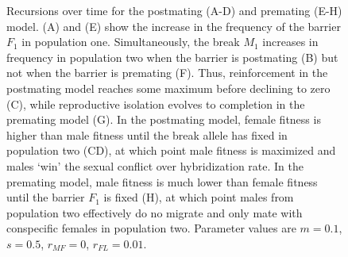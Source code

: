 \documentclass[11pt]{article}
\begin{document}

\begin{figure}
[!htb]
\centering
{}
\caption{
\linespread{1.618}\selectfont
Recursions over time for the postmating (A-D) and premating (E-H) model. (A) and (E) show the increase in the frequency of the barrier $F_1$ in population one.  Simultaneously, the break $M_1$ increases in frequency in population two when the barrier is postmating (B) but not when the barrier is premating (F). Thus, reinforcement in the postmating model reaches some maximum before declining to zero (C), while reproductive isolation evolves to completion in the premating model (G). In the postmating model, female fitness is higher than male fitness until the break allele has fixed in population two (CD), at which point male fitness is maximized and males `win' the sexual conflict over hybridization rate.  In the premating model, male fitness is much lower than female fitness until the barrier $F_1$ is fixed (H), at which point males from population two effectively do no migrate and only mate with conspecific females in population two.  Parameter values are $m = 0.1$, $s = 0.5$, $r_{MF} = 0$, $r_{FL} = 0.01$.}
\label{fig:sample}
\end{figure}
\end{document}
